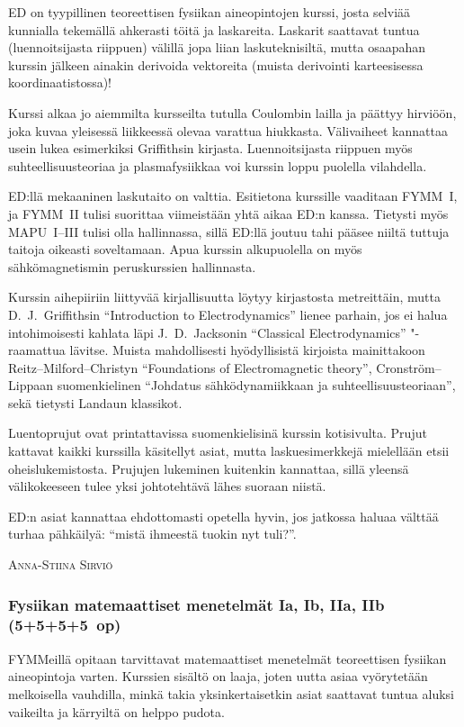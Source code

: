 \documentclass[../ala_hataile.tex]{subfiles}
\begin{document}
	ED on tyypillinen teoreettisen fysiikan
	aine\-opintojen kurssi, josta selviää kunnialla
	tekemällä ahkerasti töitä ja laskareita.
	Laskarit saattavat tuntua (luennoitsijasta
	riippuen) välillä jopa liian lasku\-teknisiltä,
	mutta osaapahan kurssin jälkeen ainakin
	derivoida vektoreita (muista derivointi karteesisessa
	koordinaatistossa)!
	
	Kurssi alkaa jo aiemmilta kursseilta tutulla
	Coulombin lailla ja päättyy hirviöön,
	joka kuvaa yleisessä liikkeessä olevaa varattua
	hiukkasta. Välivaiheet kannattaa
	usein lukea esimerkiksi Griffithsin kirjasta.
	Luennoitsijasta riippuen myös suhteellisuusteoriaa
	ja plasmafysiikkaa voi kurssin
	loppu puolella vilahdella.
	
	ED:llä mekaaninen laskutaito on valttia.
	Esitietona kurssille vaaditaan FYMM~I, ja
	FYMM~II tulisi suorittaa viimeistään yhtä
	aikaa ED:n kanssa. Tietysti myös MAPU~I--III
	tulisi olla hallinnassa, sillä ED:llä
	joutuu tahi pääsee niiltä tuttuja taitoja oikeasti
	soveltamaan. Apua kurssin alkupuolella
	on myös sähkömagnetismin peruskurssien hallinnasta.
	
	Kurssin aihepiiriin liittyvää kirjallisuutta löytyy kirjastosta metreittäin, mutta D.~J.~Griffithsin ``Introduction to Electrodynamics''
	lienee parhain, jos ei halua intohimoisesti
	kahlata läpi J.~D.~Jacksonin ``Classical
	Electrodynamics'' "-raamattua lävitse.
	Muista mahdollisesti hyödyllisistä kirjoista
	mainittakoon Reitz--Milford--Christyn
	``Foundations of Electromagnetic theory'',
	Cronström--Lippaan suomenkielinen ``Johdatus
	sähködynamiikkaan ja suhteellisuusteoriaan'',
	sekä tietysti Landaun klassikot.
	
	Luentoprujut ovat printattavissa suomen\-kielisinä
	kurssin kotisivulta. Prujut kattavat
	kaikki kurssilla käsitellyt asiat, mutta
	laskuesimerkkejä mielellään etsii oheis\-lukemistosta.
	Prujujen lukeminen kuitenkin
	kannattaa, sillä yleensä välikokeeseen tulee
	yksi johtotehtävä lähes suoraan niistä.
	
	ED:n asiat kannattaa ehdottomasti opetella
	hyvin, jos jatkossa haluaa välttää turhaa
	pähkäilyä: ``mistä ihmeestä tuokin nyt
	tuli?''. 
	
	\vspace{0.5cm}\noindent\textsc{Anna-Stiina Sirviö}
	
	\subsubsection*{Fysiikan matemaattiset menetelmät Ia, Ib, IIa, IIb (5+5+5+5~op)}
	FYMMeillä opitaan tarvittavat matemaattiset
	menetelmät teoreettisen fysiikan
	aineopintoja varten. Kurssien sisältö on
	laaja, joten uutta asiaa vyörytetään melkoisella
	vauhdilla, minkä takia yksinkertaisetkin
	asiat saattavat tuntua aluksi vaikeilta ja
	kärryiltä on helppo pudota.
	
\end{document}
